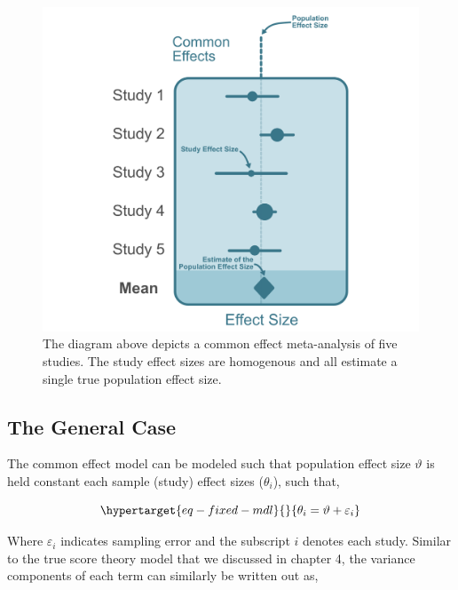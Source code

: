 \documentclass[
  letterpaper,
  DIV=11,
  numbers=noendperiod]{scrreprt}
\begin{document}
\begin{figure}

{\centering \includegraphics{figure/fixed_effects_diagram.png}

}

\caption{The diagram above depicts a common effect meta-analysis of five
studies. The study effect sizes are homogenous and all estimate a single
true population effect size.}

\end{figure}

\hypertarget{the-general-case}{%
\subsection{The General Case}\label{the-general-case}}

The common effect model can be modeled such that population effect size
\(\vartheta\) is held constant each sample (study) effect sizes
(\(\theta_i\)), such that,

\begin{equation}\protect\hypertarget{eq-fixed-mdl}{}{
\theta_i  = \vartheta + \varepsilon_i
}\label{eq-fixed-mdl}\end{equation}

Where \(\varepsilon_i\) indicates sampling error and the subscript \(i\)
denotes each study. Similar to the true score theory model that we
discussed in chapter 4, the variance components of each term can
similarly be written out as,
\end{document}

